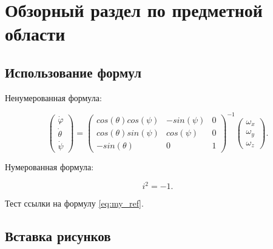 \section{Обзорный раздел по предметной области}

\subsection{Использование формул}



Ненумерованная формула:

\begin{equation}
    \begin{pmatrix} \dot{\varphi}\\ \dot{\theta} \\ \dot{\psi} \end{pmatrix}
    = \begin{pmatrix}
        cos(\theta)cos(\psi) & -sin(\psi) & 0 \\
        cos(\theta)sin(\psi) & cos(\psi)  & 0 \\
        -sin(\theta)         & 0         &  1
    \end{pmatrix}^{-1}
    \begin{pmatrix} \omega_x\\ \omega_y \\ \omega_z \end{pmatrix}.
\end{equation}

Нумерованная формула:

\begin{equation}
    i^2 = -1.
    \label{eq:my_ref}
\end{equation}

Тест ссылки на формулу \ref{eq:my_ref}.

\subsection{Вставка рисунков}

